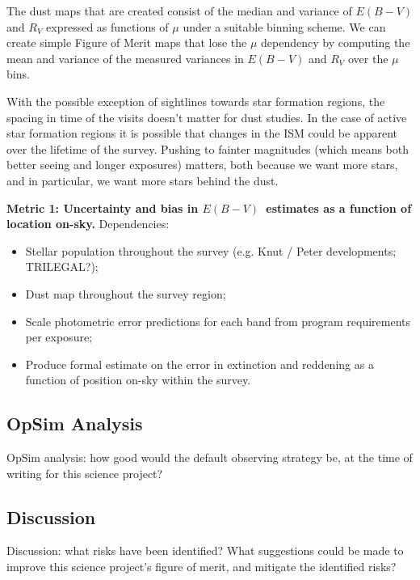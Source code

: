 The dust maps that are created consist of the median and variance of $E(B-V)$ and $R_V$ expressed as functions of 
$\mu$ under a suitable binning scheme. We can create simple Figure of Merit maps that lose the 
$\mu$ dependency by computing the mean and variance of the measured variances in $E(B-V)$ and $R_V$ 
over the $\mu$ bins.

With the possible exception of sightlines towards star formation regions, the spacing in time of the visits 
doesn't matter for dust studies. In the case of active star formation regions it is possible that changes in the
ISM could be apparent over the lifetime of the survey.
Pushing to fainter magnitudes (which means both better seeing and longer exposures) matters, 
both because we want more stars, and in particular, we want more stars behind the dust.  


{\bf Metric 1: Uncertainty and bias in $E(B-V)$~estimates as a
  function of location on-sky.} Dependencies:

\begin{itemize}
  \item Stellar population throughout the survey (e.g. Knut / Peter developments; TRILEGAL?);
    \item Dust map throughout the survey region;
    \item Scale photometric error predictions for each band from program requirements per exposure;
      \item Produce formal estimate on the error in extinction and reddening as a function of position on-sky within the survey.
\end{itemize}



\subsection{OpSim Analysis}
\label{sec:\secname:analysis}

OpSim analysis: how good would the default observing strategy be, at
the time of writing for this science project?



\subsection{Discussion}
\label{sec:\secname:discussion}

Discussion: what risks have been identified? What suggestions could be
made to improve this science project's figure of merit, and mitigate
the identified risks?



\navigationbar
